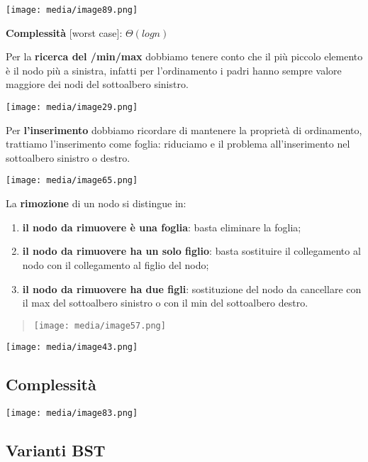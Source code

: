\texttt{[image: media/image89.png]}

\textbf{Complessità} {[}worst case{]}: \(\Theta(logn)\)

Per la \textbf{ricerca del /min/max} dobbiamo tenere conto che il più
piccolo elemento è il nodo più a sinistra, infatti per l'ordinamento i
padri hanno sempre valore maggiore dei nodi del sottoalbero sinistro.

\texttt{[image: media/image29.png]}

Per \textbf{l'inserimento} dobbiamo ricordare di mantenere la proprietà
di ordinamento, trattiamo l'inserimento come foglia: riduciamo e il
problema all'inserimento nel sottoalbero sinistro o destro.

\texttt{[image: media/image65.png]}

La \textbf{rimozione} di un nodo si distingue in:

\begin{enumerate}
\def\labelenumi{\arabic{enumi}.}
\item
  \textbf{il nodo da rimuovere è una foglia}: basta eliminare la foglia;
\item
  \textbf{il nodo da rimuovere ha un solo figlio}: basta sostituire il
  collegamento al nodo con il collegamento al figlio del nodo;
\item
  \textbf{il nodo da rimuovere ha due figli}: sostituzione del nodo da
  cancellare con il max del sottoalbero sinistro o con il min del
  sottoalbero destro.
\end{enumerate}

\begin{quote}
\texttt{[image: media/image57.png]}
\end{quote}

\texttt{[image: media/image43.png]}

\subsection{Complessità}\label{complessituxe0-1}

\texttt{[image: media/image83.png]}

\subsection{Varianti BST}\label{varianti-bst}


